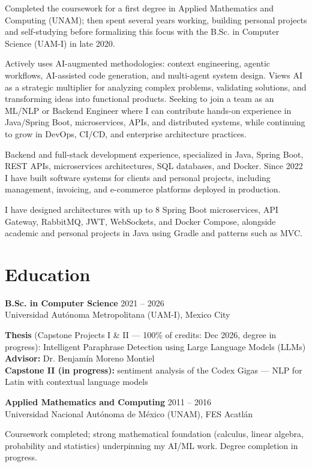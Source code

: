 \documentclass[10pt,letterpaper]{article}
\newcommand{\entry}[4]{%
  \noindent
  \textbf{#1} \hfill {\small\color{textsec}#2}\\
  {\small\color{accent}#3}
  \vspace{0.08cm}
  \par\noindent#4
  \par\vspace{0.16cm}
}
\newcommand{\decorule}{\vspace{0.1cm}{\color{accent}\rule{1.5cm}{2.5pt}}\vspace{0.2cm}}
\begin{document}
Completed the coursework for a first degree in Applied Mathematics and Computing (UNAM); then spent several years working, building personal projects and self-studying before formalizing this focus with the B.Sc. in Computer Science (UAM-I) in late 2020.

Actively uses AI-augmented methodologies: context engineering, agentic workflows, AI-assisted code generation, and multi-agent system design. Views AI as a strategic multiplier for analyzing complex problems, validating solutions, and transforming ideas into functional products. Seeking to join a team as an ML/NLP or Backend Engineer where I can contribute hands-on experience in Java/Spring Boot, microservices, APIs, and distributed systems, while continuing to grow in DevOps, CI/CD, and enterprise architecture practices.

Backend and full-stack development experience, specialized in Java, Spring Boot, REST APIs, microservices architectures, SQL databases, and Docker. Since 2022 I have built software systems for clients and personal projects, including management, invoicing, and e-commerce platforms deployed in production.

I have designed architectures with up to 8 Spring Boot microservices, API Gateway, RabbitMQ, JWT, WebSockets, and Docker Compose, alongside academic and personal projects in Java using Gradle and patterns such as MVC.

\decorule

\vspace{0.5cm}

\section*{Education}
\entry{B.Sc. in Computer Science}
       {2021 -- 2026}
       {Universidad Aut\'{o}noma Metropolitana (UAM-I), Mexico City}
       {\textbf{Thesis} (Capstone Projects I \& II — 100\% of credits: Dec 2026, degree in progress): Intelligent Paraphrase Detection using Large Language Models (LLMs) \\
        \textbf{Advisor:} Dr. Benjam\'{i}n Moreno Montiel \\
        \textbf{Capstone II (in progress):} sentiment analysis of the Codex Gigas — NLP for Latin with contextual language models}
\entry{Applied Mathematics and Computing}
       {2011 -- 2016}
       {Universidad Nacional Aut\'{o}noma de M\'{e}xico (UNAM), FES Acatl\'{a}n}
       {Coursework completed; strong mathematical foundation (calculus, linear algebra, probability and statistics) underpinning my AI/ML work. Degree completion in progress.}
\end{document}
